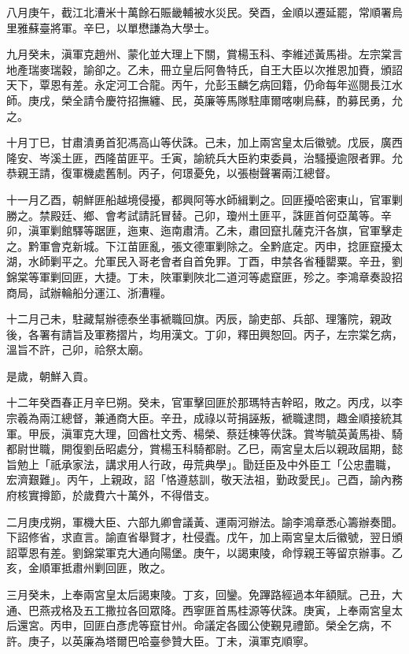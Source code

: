 \begin{pinyinscope}
八月庚午，截江北漕米十萬餘石賑畿輔被水災民。癸酉，金順以遷延罷，常順署烏里雅蘇臺將軍。辛巳，以單懋謙為大學士。

九月癸未，滇軍克趙州、蒙化並大理上下關，賞楊玉科、李維述黃馬褂。左宗棠言地產瑞麥瑞穀，諭卻之。乙未，冊立皇后阿魯特氏，自王大臣以次推恩加賚，頒詔天下，覃恩有差。永定河工合龍。丙午，允彭玉麟乞病回籍，仍命每年巡閱長江水師。庚戌，榮全請令慶符招撫纏、民，英廉等馬隊駐庫爾喀喇烏蘇，酌募民勇，允之。

十月丁巳，甘肅潰勇首犯馮高山等伏誅。己未，加上兩宮皇太后徽號。戊辰，廣西隆安、岑溪土匪，西隆苗匪平。壬寅，諭統兵大臣約束委員，治騷擾逾限者罪。允恭親王請，復軍機處舊制。丙子，何璟憂免，以張樹聲署兩江總督。

十一月乙酉，朝鮮匪船越境侵擾，都興阿等水師緝剿之。回匪擾哈密東山，官軍剿勝之。禁殿廷、鄉、會考試請託冒替。己卯，瓊州土匪平，誅匪首何亞萬等。辛卯，滇軍剿館驛等踞匪，迤東、迤南肅清。乙未，肅回竄扎薩克汗各旗，官軍擊走之。黔軍會克新城。下江苗匪亂，張文德軍剿除之。全黔底定。丙申，捻匪竄擾太湖，水師剿平之。允軍民入哥老會者自首免罪。丁酉，申禁各省種罌粟。辛丑，劉錦棠等軍剿回匪，大捷。丁未，陜軍剿陜北二道河等處竄匪，殄之。李鴻章奏設招商局，試辦輪船分運江、浙漕糧。

十二月己未，駐藏幫辦德泰坐事褫職回旗。丙辰，諭吏部、兵部、理籓院，親政後，各署有請旨及軍務摺片，均用漢文。丁卯，釋田興恕回。丙子，左宗棠乞病，溫旨不許，己卯，祫祭太廟。

是歲，朝鮮入貢。

十二年癸酉春正月辛巳朔。癸未，官軍擊回匪於那瑪特吉幹昭，敗之。丙戌，以李宗羲為兩江總督，兼通商大臣。辛丑，成祿以苛捐誣叛，褫職逮問，趣金順接統其軍。甲辰，滇軍克大理，回酋杜文秀、楊榮、蔡廷棟等伏誅。賞岑毓英黃馬褂、騎都尉世職，開復劉岳昭處分，賞楊玉科騎都尉。乙巳，兩宮皇太后以親政屆期，懿旨勉上「祇承家法，講求用人行政，毋荒典學」。勖廷臣及中外臣工「公忠盡職，宏濟艱難」。丙午，上親政，詔「恪遵慈訓，敬天法祖，勤政愛民」。己酉，諭內務府核實撙節，於歲費六十萬外，不得借支。

二月庚戌朔，軍機大臣、六部九卿會議黃、運兩河辦法。諭李鴻章悉心籌辦奏聞。下詔修省，求直言。諭直省舉賢才，杜侵蠹。戊午，加上兩宮皇太后徽號，翌日頒詔覃恩有差。劉錦棠軍克大通向陽堡。庚午，以謁東陵，命惇親王等留京辦事。乙亥，金順軍抵肅州剿回匪，敗之。

三月癸未，上奉兩宮皇太后謁東陵。丁亥，回鑾。免蹕路經過本年額賦。己丑，大通、巴燕戎格及五工撒拉各回眾降。西寧匪首馬桂源等伏誅。庚寅，上奉兩宮皇太后還宮。丙申，回匪白彥虎等竄甘州。命議定各國公使覲見禮節。榮全乞病，不許。庚子，以英廉為塔爾巴哈臺參贊大臣。丁未，滇軍克順寧。


\end{pinyinscope}
